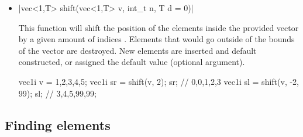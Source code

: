 \documentclass[12pt]{report}
\newenvironment{example}
{
    \begin{mdframed}[style=example,frametitle={Example}]
}
{
    \end{mdframed}
}
\begin{document}
\begin{itemize}
\item \cppinline|vec<1,T> shift(vec<1,T> v, int_t n, T d = 0)| 

This function will shift the position of the elements inside the provided vector  by a given amount of indices . Elements that would go outside of the bounds of the vector are destroyed. New elements are inserted and default constructed, or assigned the default value  (optional argument).

\begin{example}
\begin{cppcode}
vec1i v = {1,2,3,4,5};
vec1i sr = shift(v, 2);
sr; // {0,0,1,2,3}
vec1i sl = shift(v, -2, 99);
sl; // {3,4,5,99,99};
\end{cppcode}
\end{example}
\end{itemize}

\subsection{Finding elements}
\end{document}
